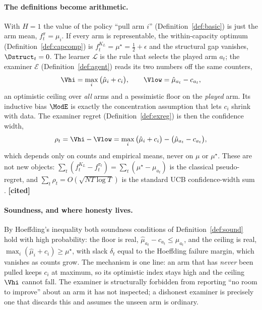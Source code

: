 \paragraph{The definitions become arithmetic.} With $H=1$ the value of the policy
``pull arm $i$'' (Definition~\ref{def:basic}) is just the arm mean,
$f^{\pi}_t=\mu_i$. If every arm is representable, the within-capacity optimum
(Definition~\ref{def:capcomp}) is $f^{K_L}_t=\mu^\star=\tfrac12+\epsilon$ and the
structural gap vanishes, $\Dstruct_t=0$. The learner $\mathcal{L}$ is the rule that
selects the played arm $a_t$; the examiner $\mathcal{E}$ (Definition~\ref{def:agent})
reads its two numbers off the same counters,
\[
\Vhi=\max_i\big(\hat\mu_i+c_i\big),
\qquad
\Vlow=\hat\mu_{a_t}-c_{a_t},
\]
an optimistic ceiling over \emph{all} arms and a pessimistic floor on the
\emph{played} arm. Its inductive bias $\ModE$ is exactly the concentration assumption
that lets $c_i$ shrink with data. The examiner regret (Definition~\ref{def:exreg}) is
then the confidence width,
\[
\rho_t=\Vhi-\Vlow=\max_i\big(\hat\mu_i+c_i\big)-\big(\hat\mu_{a_t}-c_{a_t}\big),
\]
which depends only on counts and empirical means, never on $\mu$ or $\mu^\star$.
These are not new objects: $\sum_t (f^{K_L}_t-f^{\pi_t}_t)=\sum_t(\mu^\star-\mu_{a_t})$
is the classical pseudo-regret, and $\sum_t\rho_t=O(\sqrt{NT\log T})$ is the standard
UCB confidence-width sum \citep{auer2002ucb,lai1985asymptotically}. \textbf{[cited]}

\paragraph{Soundness, and where honesty lives.} By Hoeffding's inequality both
soundness conditions of Definition~\ref{def:sound} hold with high probability: the
floor is real, $\hat\mu_{a_t}-c_{a_t}\le\mu_{a_t}$, and the ceiling is real,
$\max_i(\hat\mu_i+c_i)\ge\mu^\star$, with slack $\delta_t$ equal to the Hoeffding
failure margin, which vanishes as counts grow. The mechanism is one line: an arm that
has \emph{never} been pulled keeps $c_i$ at maximum, so its optimistic index stays
high and the ceiling $\Vhi$ cannot fall. The examiner is structurally forbidden from
reporting ``no room to improve'' about an arm it has not inspected; a dishonest
examiner is precisely one that discards this and assumes the unseen arm is ordinary.

